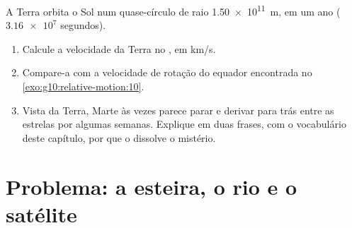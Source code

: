 \begin{exercise}[$\star\star\star$]\label{exo:g10:relative-motion:15}
A Terra orbita o Sol num quase-círculo de raio \qty{1.50e11}{m}, em um
ano ($\num{3.16e7}$ segundos).
\begin{enumerate}
  \item Calcule a velocidade da Terra no , em
        \unit{km/s}.
  \item Compare-a com a velocidade de rotação do equador encontrada no
        \cref{exo:g10:relative-motion:10}.
  \item Vista da Terra, Marte às vezes parece parar e derivar para trás
        entre as estrelas por algumas semanas. Explique em duas frases,
        com o vocabulário deste capítulo, por que o  dissolve o mistério.
\end{enumerate}
\end{exercise}

\section{Problema: a esteira, o rio e o satélite}

